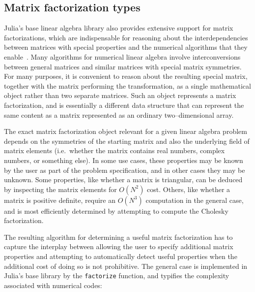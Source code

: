 \documentclass[pldi]{sigplanconf-pldi15}
\begin{document}
\subsection{Matrix factorization types}

Julia's base linear algebra library also provides extensive support for matrix
factorizations, which are indispensable for reasoning about the
interdependencies between matrices with special properties and the numerical
algorithms that they enable~\cite{Golub1996}. Many algorithms for numerical
linear algebra involve interconversions between general matrices and similar
matrices with special matrix symmetries. For many purposes, it is convenient to
reason about the resulting special matrix, together with the matrix performing
the transformation, as a single mathematical object rather than two separate
matrices. Such an object represents a matrix factorization, and is essentially
a different data structure that can represent the same content as a matrix
represented as an ordinary two--dimensional array.

The exact matrix factorization object relevant for a given linear algebra
problem depends on the symmetries of the starting matrix and also the
underlying field of matrix elements (i.e.\ whether the matrix contains real
numbers, complex numbers, or something else). In some use cases, these
properties may be known by the user as part of the problem specification, and
in other cases they may be unknown. Some properties, like whether a
matrix is triangular, can be deduced by inspecting the matrix elements for
$O(N^2)$ cost. Others, like whether a matrix is positive definite, require an
$O(N^3)$ computation in the general case, and is most efficiently determined by
attempting to compute the Cholesky factorization.

The resulting algorithm for determining a useful matrix factorization has to
capture the interplay between allowing the user to specify additional matrix
properties and attempting to automatically detect useful properties when the
additional cost of doing so is not prohibitive. The general case is implemented
in Julia's base library by the \verb|factorize| function, and typifies the
complexity associated with numerical codes: 
\end{document}

